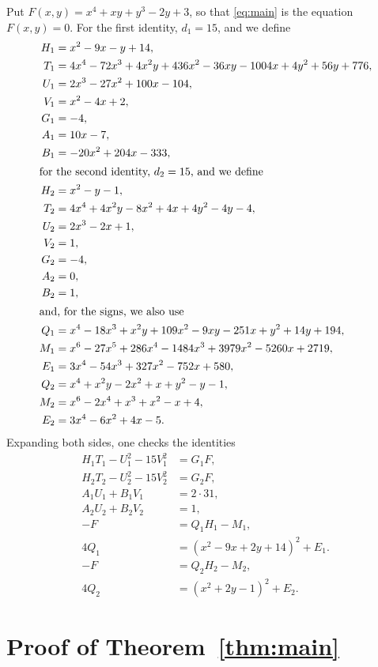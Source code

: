 \documentclass[11pt]{article}
\begin{document}
Put $F(x,y)=x^{4}+xy+y^{3}-2y+3$, so that \eqref{eq:main} is the equation $F(x,y)=0$.
For the first identity, $d_{1}=15$, and we define
\begin{align*}
H_{1}&=x^{2}-9x-y+14,\\
T_{1}&=4x^{4}-72x^{3}+4x^{2}y+436x^{2}-36xy-1004x+4y^{2}+56y+776,\\
U_{1}&=2x^{3}-27x^{2}+100x-104,\\
V_{1}&=x^{2}-4x+2,\\
G_{1}&=-4,\\
A_{1}&=10x-7,\\
B_{1}&=-20x^{2}+204x-333,\\
\intertext{for the second identity, $d_{2}=15$, and we define}
H_{2}&=x^{2}-y-1,\\
T_{2}&=4x^{4}+4x^{2}y-8x^{2}+4x+4y^{2}-4y-4,\\
U_{2}&=2x^{3}-2x+1,\\
V_{2}&=1,\\
G_{2}&=-4,\\
A_{2}&=0,\\
B_{2}&=1,\\
\intertext{and, for the signs, we also use}
Q_{1}&=x^{4}-18x^{3}+x^{2}y+109x^{2}-9xy-251x+y^{2}+14y+194,\\
M_{1}&=x^{6}-27x^{5}+286x^{4}-1484x^{3}+3979x^{2}-5260x+2719,\\
E_{1}&=3x^{4}-54x^{3}+327x^{2}-752x+580,\\
Q_{2}&=x^{4}+x^{2}y-2x^{2}+x+y^{2}-y-1,\\
M_{2}&=x^{6}-2x^{4}+x^{3}+x^{2}-x+4,\\
E_{2}&=3x^{4}-6x^{2}+4x-5.
\end{align*}
Expanding both sides, one checks the identities
\begin{align}
H_{1}T_{1}-U_{1}^2-15V_{1}^2&=G_{1}F,\label{eq:norm1}\\
H_{2}T_{2}-U_{2}^2-15V_{2}^2&=G_{2}F,\label{eq:norm2}\\
A_{1}U_{1}+B_{1}V_{1}&=2\cdot 31,\label{eq:bez1}\\
A_{2}U_{2}+B_{2}V_{2}&=1,\label{eq:bez2}\\
-F&=Q_{1}H_{1}-M_{1},\label{eq:sign1}\\
4Q_{1}&=(x^{2}-9x+2y+14)^2+E_{1}.\label{eq:sign1b}\\
-F&=Q_{2}H_{2}-M_{2},\label{eq:sign2}\\
4Q_{2}&=(x^{2}+2y-1)^2+E_{2}.\label{eq:sign2b}
\end{align}

\section{Proof of Theorem~\ref{thm:main}}
\end{document}
